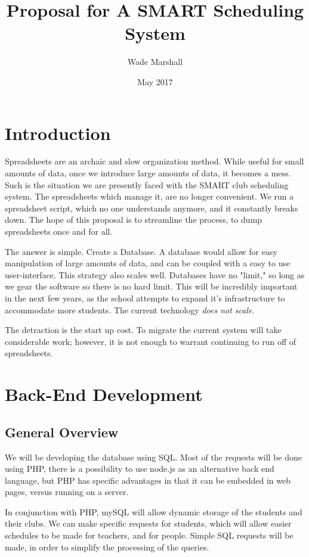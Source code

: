 \documentclass{article}
\title{Proposal for A SMART Scheduling System}
\author{Wade Marshall }
\date{May 2017}
\begin{document}
\maketitle

\section{Introduction}
Spreadsheets are an archaic and slow organization method. While useful for small amounts of data, once we introduce large amounts of data, it
becomes a mess. Such is the situation we are presently faced with the SMART club scheduling system. The spreadsheets which manage it, are no
longer convenient. We run a spreadsheet script, which no one understands anymore, and it constantly breaks down. The hope of this proposal is to 
streamline the process, to dump spreadsheets once and for all. 

The answer is simple. Create a Database. A database would allow for easy manipulation of large amounts of data, and can be coupled with a easy
to use user-interface. This strategy also scales well. Databases have no "limit," so long as we gear the software so there is no hard limit. This 
will be incredibly important in the next few years, as the school attempts to expand it's infrastructure to accommodate more students. The 
current technology \emph{does not scale.}

The detraction is the start up cost. To migrate the current system will take considerable work; however, it is not enough to warrant continuing
to run off of spreadsheets. 

\section{Back-End Development}
\subsection{General Overview}
We will be developing the database using SQL. Most of the requests will be done using PHP, there is a possibility to use node.js as an alternative back end language, but PHP has specific advantages in that it can be embedded in web pages, versus running on a server. 

In conjunction with PHP, mySQL will allow dynamic storage of the students and their clubs. We can make specific requests for students, which 
will
allow easier schedules to be made for teachers, and for people. Simple SQL requests will be made, in order to simplify the processing of the 
queries. 
\end{document}

